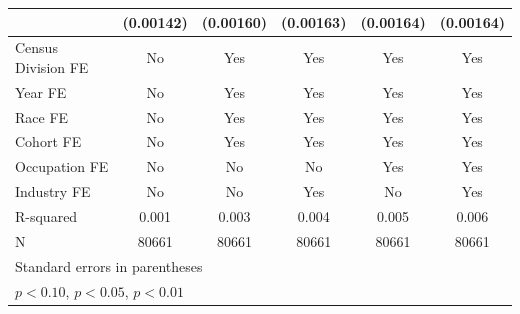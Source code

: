 {\begin{tabular}{l*{5}{c}}
                    &   (0.00142)         &   (0.00160)         &   (0.00163)         &   (0.00164)         &   (0.00164)         \\
\hline
Census Division FE  &          No         &         Yes         &         Yes         &         Yes         &         Yes         \\
Year FE             &          No         &         Yes         &         Yes         &         Yes         &         Yes         \\
Race FE             &          No         &         Yes         &         Yes         &         Yes         &         Yes         \\
Cohort FE           &          No         &         Yes         &         Yes         &         Yes         &         Yes         \\
Occupation FE       &          No         &          No         &          No         &         Yes         &         Yes         \\
Industry FE         &          No         &          No         &         Yes         &          No         &         Yes         \\
R-squared           &       0.001         &       0.003         &       0.004         &       0.005         &       0.006         \\
N                   &       80661         &       80661         &       80661         &       80661         &       80661         \\
\hline\hline
\multicolumn{6}{l}{\footnotesize Standard errors in parentheses}\\
\multicolumn{6}{l}{\footnotesize \sym{*} \(p<0.10\), \sym{**} \(p<0.05\), \sym{***} \(p<0.01\)}\\
\end{tabular}
}
